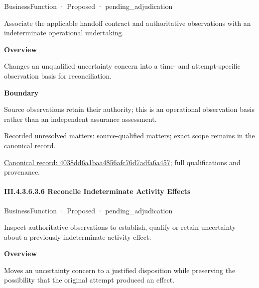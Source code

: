 \label{element:4038dd6a1baa4856afc76d7adfa6a457}
{\small BusinessFunction · Proposed · pending\_adjudication}\par

Associate the applicable handoff contract and authoritative observations with an indeterminate operational undertaking.



\textbf{Overview}



Changes an unqualified uncertainty concern into a time- and attempt-specific observation basis for reconciliation.



\textbf{Boundary}



Source observations retain their authority; this is an operational observation basis rather than an independent assurance assessment.


{\small Recorded unresolved matters: source-qualified matters; exact scope remains in the canonical record.}\par
{\footnotesize \href{../../../../../../../continuum/business/business-function/4038dd6a1baa4856afc76d7adfa6a457.md}{Canonical record: 4038dd6a1baa4856afc76d7adfa6a457}; full qualifications and provenance.}\par
\paragraph*{III.4.3.6.3.6 Reconcile Indeterminate Activity Effects}
\label{navigation:III.4.3.6.3.6}

\label{element:eace49fe7b304ad786d460ccef622378}
{\small BusinessFunction · Proposed · pending\_adjudication}\par

Inspect authoritative observations to establish, qualify or retain uncertainty about a previously indeterminate activity effect.



\textbf{Overview}



Moves an uncertainty concern to a justified disposition while preserving the possibility that the original attempt produced an effect.



